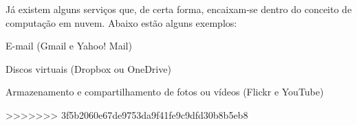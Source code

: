 Já existem alguns serviços que, de certa forma, encaixam-se dentro do
conceito de computação em nuvem. Abaixo estão alguns exemplos:

\begin{itemise}
    \item E-mail (Gmail e Yahoo! Mail)

    \item Discos virtuais (Dropbox ou OneDrive)

    \item Armazenamento e compartilhamento de fotos ou vídeos (Flickr e YouTube)
\end{itemise}

>>>>>>> 3f5b2060e67de9753da9f41fe9c9dfd30b8b5eb8
